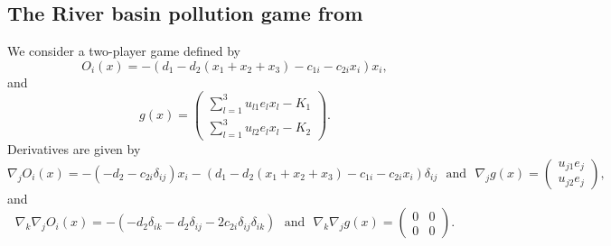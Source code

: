 \documentclass[11pt]{article}
\newcommand{\txtm}[1]{\textrm{~~#1~~}}
\begin{document}
\subsection{The River basin pollution game from \cite{krawuryasev00}}
We consider a two-player game defined by 
$$
O_i(x) = - (d_1 - d_2 (x_1+x_2+x_3) - c_{1i} - c_{2i} x_i)x_i,
$$
and
$$
g(x) = 
\left( \begin{matrix}
\sum\limits_{l=1}^3 u_{l1} e_l x_l - K_1 \\
\sum\limits_{l=1}^3 u_{l2} e_l x_l - K_2 
\end{matrix} \right).
$$
Derivatives are given by
$$
\nabla_j O_i(x) = - ( - d_2  - c_{2i} \delta_{ij})x_i - (d_1 - d_2 (x_1+x_2+x_3) - c_{1i} - c_{2i} x_i)\delta_{ij}
\txtm{and}
\nabla_j g(x) = 
\left( \begin{matrix}
u_{j1} e_j  \\
u_{j2} e_j
\end{matrix} \right),
$$
and
$$
\nabla_k \nabla_j O_i(x) = -( - d_2\delta_{ik} - d_2\delta_{ij}  - 2 c_{2i} \delta_{ij}\delta_{ik})
\txtm{and}
\nabla_k \nabla_j g(x) = 
\left( \begin{matrix}
0 & 0  \\
0 & 0
\end{matrix} \right).
$$




\newpage




\appendix
\end{document}
